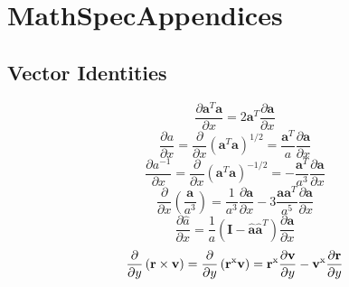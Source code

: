 \chapter{MathSpecAppendices}

\section{Vector Identities}


\begin{equation}
     \frac{\partial \mathbf{a}^T \mathbf{a} }{\partial x } = 2 \mathbf{a}^T
     \frac{\partial \mathbf{a}}{\partial x}
\end{equation}
%
\begin{equation}
     \frac{\partial a }{\partial x }= \frac{\partial  }{\partial x }\left(\mathbf{a}^T \mathbf{a}\right)^{1/2} =
     \frac{\mathbf{a}^T}{a}
     \frac{\partial \mathbf{a}}{\partial x}
\end{equation}
%
\begin{equation}
     \frac{\partial a^{-1} }{\partial x }= \frac{\partial  }{\partial x }\left(\mathbf{a}^T \mathbf{a}\right)^{-1/2}
     =-
     \frac{\mathbf{a}^T}{a^3}
     \frac{\partial \mathbf{a}}{\partial x}
\end{equation}
%
\begin{equation}
    \frac{\partial }{\partial x}\left( \frac{\mathbf{a}}{a^3} \right) =
    \frac{1}{a^3}\frac{\partial \mathbf{a} }{\partial x} - 3\frac{\mathbf{a}\mathbf{a}^T}{a^5}\frac{\partial \mathbf{a} }{\partial x}
    \label{Eq:vecIDaveca3}
\end{equation}
%
\begin{equation}
     \frac{\partial \hat{a} }{\partial x } = \frac{1}{a} \left(\mathbf{I} - \hat{\mathbf{a}}\hat{\mathbf{a}}^T\right) \frac{\partial \mathbf{a} }{\partial x }
\end{equation} 
%
\begin{equation}
     \frac{\partial  }{\partial y}  \left( \mathbf{r} \times \mathbf{v}  \right) = \frac{\partial }{\partial y } \left( \mathbf{r}^{\text{x}}\mathbf{v} \right) = \mathbf{r}^{\text{x}}\frac{\partial \mathbf{v}}{\partial y} - \mathbf{v}^{\text{x}}\frac{\partial \mathbf{r}}{\partial y}
\end{equation} 
%
